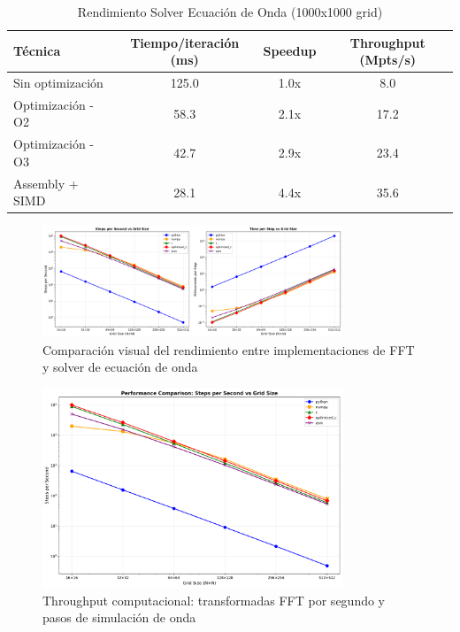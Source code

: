 \documentclass[a4paper]{article}
\begin{document}
\begin{table}[h]
\centering
\caption{Rendimiento Solver Ecuación de Onda (1000x1000 grid)}
\begin{tabular}{@{}lccc@{}}
\toprule
Técnica & Tiempo/iteración (ms) & Speedup & Throughput (Mpts/s) \\
\midrule
Sin optimización & 125.0 & 1.0x & 8.0 \\
Optimización -O2 & 58.3 & 2.1x & 17.2 \\
Optimización -O3 & 42.7 & 2.9x & 23.4 \\
Assembly + SIMD & 28.1 & 4.4x & 35.6 \\
\bottomrule
\end{tabular}
\label{tab:wave_performance}
\end{table}

\begin{figure}[h]
\centering
\includegraphics[width=0.8\textwidth]{../results/combined_performance.png}
\caption{Comparación visual del rendimiento entre implementaciones de FFT y solver de ecuación de onda}
\label{fig:performance}
\end{figure}

\begin{figure}[h]
\centering
\includegraphics[width=0.8\textwidth]{../results/steps_per_second.png}
\caption{Throughput computacional: transformadas FFT por segundo y pasos de simulación de onda}
\label{fig:throughput}
\end{figure}
\end{document}
